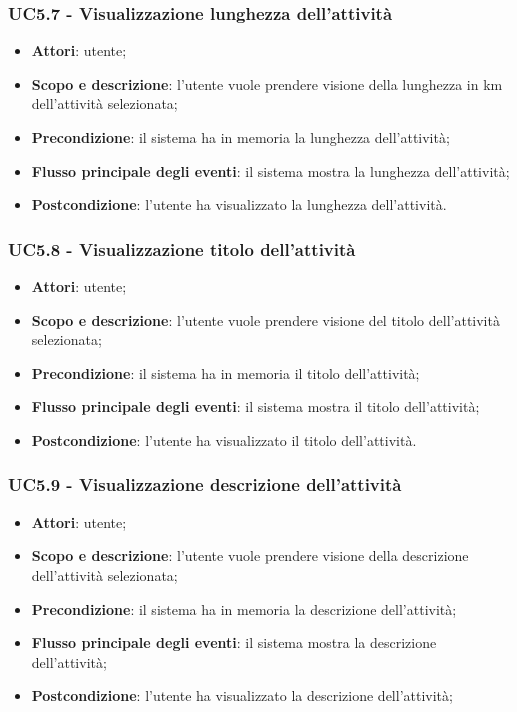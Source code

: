 \subsubsection{UC5.7 - Visualizzazione lunghezza dell’attività }
\begin{itemize}
	\item \textbf{Attori}: utente;
	\item \textbf{Scopo e descrizione}: l’utente vuole prendere visione della lunghezza in km dell'attività selezionata;
	\item \textbf{Precondizione}: il sistema ha in memoria la lunghezza dell'attività;
	\item \textbf{Flusso principale degli eventi}: il sistema mostra la lunghezza dell'attività;
	\item \textbf{Postcondizione}: l’utente ha visualizzato la lunghezza dell'attività.
\end{itemize}

\subsubsection{UC5.8 - Visualizzazione titolo dell’attività }
\begin{itemize}
	\item \textbf{Attori}: utente;
	\item \textbf{Scopo e descrizione}: l’utente vuole prendere visione del titolo dell’attività selezionata;
	\item \textbf{Precondizione}: il sistema ha in memoria il titolo dell’attività;
	\item \textbf{Flusso principale degli eventi}: il sistema mostra il titolo dell’attività;
	\item \textbf{Postcondizione}: l’utente ha visualizzato il titolo dell’attività.
\end{itemize}

\subsubsection{UC5.9 - Visualizzazione descrizione dell’attività }
\begin{itemize}
	\item \textbf{Attori}: utente;
	\item \textbf{Scopo e descrizione}: l’utente vuole prendere visione della descrizione dell'attività selezionata;
	\item \textbf{Precondizione}: il sistema ha in memoria la descrizione dell'attività;
	\item \textbf{Flusso principale degli eventi}: il sistema mostra la descrizione dell'attività;
	\item \textbf{Postcondizione}: l’utente ha visualizzato la descrizione dell'attività;
\end{itemize}

